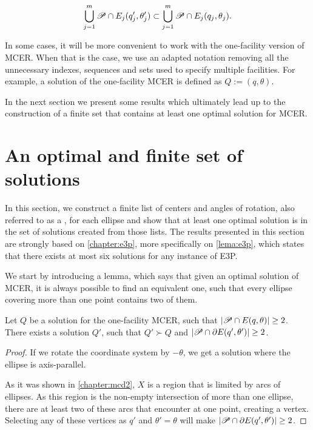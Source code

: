 $$\bigcup_{j=1}^m\mathscr{P} \cap E_j(q_j', \theta_j') \subset \bigcup_{j=1}^m\mathscr{P} \cap E_j(q_j, \theta_j).$$

In some cases, it will be more convenient to work with the one-facility version of MCER. When that is the case, we use an adapted notation removing all the unnecessary indexes, sequences and sets used to specify multiple facilities. For example, a solution of the one-facility MCER is defined as $Q := (q, \theta)$.

In the next section we present some results which ultimately lead up to the construction of a finite set that contains at least one optimal solution for MCER.

\section{An optimal and finite set of solutions}

In this section, we construct a finite list of centers and angles of rotation, also referred to as a , for each ellipse and show that at least one optimal solution is in the set of solutions created from those lists. The results presented in this section are strongly based on \autoref{chapter:e3p}, more specifically on \autoref{lema:e3p}, which states that there exists at most six solutions for any instance of E3P.

We start by introducing a lemma, which says that given an optimal solution of MCER, it is always possible to find an equivalent one, such that every ellipse covering more than one point contains two of them.

\begin{lema}\label{lema:mce_2b}
	Let $Q$ be a solution for the one-facility MCER, such that $|\mathscr{P} \cap E(q, \theta)| \ge 2$.
	There exists a solution $Q'$, such that $Q' \succ Q$ and $|\mathscr{P} \cap \partial E(q', \theta')|\ge 2$.
\end{lema}

\begin{proof}
	If we rotate the coordinate system by $-\theta$, we get a solution where the ellipse is axis-parallel.

	As it was shown in \autoref{chapter:mcd2}, $X$ is a region that is limited by arcs of ellipses. As this region is the non-empty intersection of more than one ellipse, there are at least two of these arcs that encounter at one point, creating a vertex. Selecting any of these vertices as $q'$ and $\theta'=\theta$ will make $|\mathscr{P} \cap \partial E(q', \theta')| \ge 2$.
	
\end{proof}

